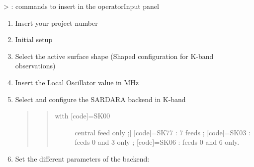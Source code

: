 \documentclass[letterpaper,10pt,english]{sphinxmanual}
\begin{document}
\textgreater{} : commands to insert in the operatorInput panel
\begin{enumerate}
\item {} 
Insert your project number
\begin{quote}

\end{quote}

\item {} 
Initial setup
\begin{quote}


\end{quote}

\item {} 
Select the active surface shape (Shaped configuration for K-band observations)
\begin{quote}

\end{quote}

\item {} 
Insert the Local Oscillator value in MHz
\begin{quote}

\end{quote}

\item {} 
Select and configure the SARDARA backend in K-band
\begin{quote}


\begin{quote}
\begin{description}
\item[{with {[}code{]}=SK00}] \leavevmode{[}central feed only ;{]}
{[}code{]}=SK77 : 7 feeds ;
{[}code{]}=SK03 : feeds 0 and 3 only ;
{[}code{]}=SK06 : feeds 0 and 6 only.

\end{description}
\end{quote}
\end{quote}

\item {} 
Set the different parameters of the backend:


\end{enumerate}
\end{document}
